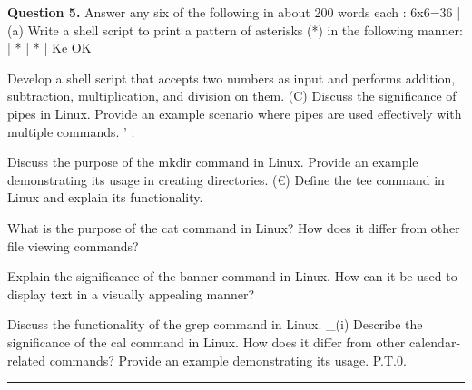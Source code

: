 \documentclass[11pt,a4paper]{article}
\begin{document}
\medskip\noindent\textbf{Question 5.} Answer any six of the following in about 200 words each : 6x6=36
| (a) Write a shell script to print a pattern of asterisks (*) in the following manner:
| *
| *
| Ke OK
\begin{parts}
  \item Develop a shell script that accepts two numbers as input and performs addition, subtraction,
  multiplication, and division on them.
  (C) Discuss the significance of pipes in Linux. Provide an example scenario where pipes are used
  effectively with multiple commands. ’ :
  \item Discuss the purpose of the mkdir command in Linux. Provide an example demonstrating its usage
  in creating directories.
  (€) Define the tee command in Linux and explain its functionality.
  \item What is the purpose of the cat command in Linux? How does it differ from other file viewing
  commands?
  \item Explain the significance of the banner command in Linux. How can it be used to display text in a
  visually appealing manner?
  \item Discuss the functionality of the grep command in Linux.
  \_(i) Describe the significance of the cal command in Linux. How does it differ from other calendar-
  related commands? Provide an example demonstrating its usage.
  P.T.0.
\end{parts}

\bigskip{}
\rule{\linewidth}{0.4pt}\smallskip
\end{document}
